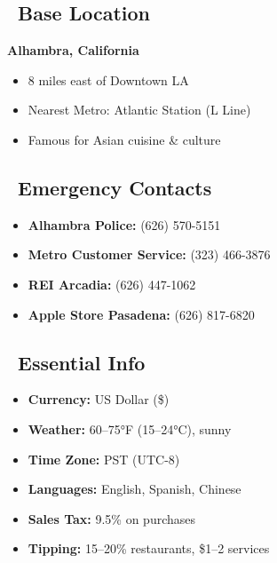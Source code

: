 \documentclass[10pt,letterpaper]{article}
\begin{document}
\subsection*{\faHome\ Base Location}

\begin{infobox}[colback=gray!10,colframe=gray]
\textbf{Alhambra, California}
\begin{itemize}[leftmargin=0.2in]
\item 8 miles east of Downtown LA
\item Nearest Metro: Atlantic Station (L Line)
\item Famous for Asian cuisine \& culture
\end{itemize}
\end{infobox}

\subsection*{\faPhone\ Emergency Contacts}

\begin{emergencybox}[title=\faExclamationTriangle\ EMERGENCY: 911]
\end{emergencybox}

\begin{small}
\begin{itemize}[leftmargin=0.2in,itemsep=1pt]
\item \textbf{Alhambra Police:} (626) 570-5151
\item \textbf{Metro Customer Service:} (323) 466-3876
\item \textbf{REI Arcadia:} (626) 447-1062
\item \textbf{Apple Store Pasadena:} (626) 817-6820
\end{itemize}
\end{small}

\subsection*{\faInfoCircle\ Essential Info}

\begin{small}
\begin{itemize}[leftmargin=0.2in,itemsep=1pt]
\item \textbf{Currency:} US Dollar (\$)
\item \textbf{Weather:} 60--75°F (15--24°C), sunny
\item \textbf{Time Zone:} PST (UTC-8)
\item \textbf{Languages:} English, Spanish, Chinese
\item \textbf{Sales Tax:} 9.5\% on purchases
\item \textbf{Tipping:} 15--20\% restaurants, \$1--2 services
\end{itemize}
\end{small}
\end{document}

